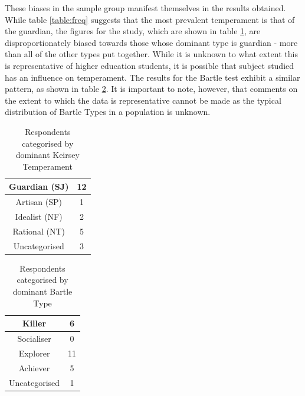 \documentclass[12pt,a4paper,twoside]{report}
\begin{document}
These biases in the sample group manifest themselves in the results obtained. While table \ref{table:freq} suggests that the most prevalent temperament is that of the guardian, the figures for the study, which are shown in table \ref{table:kfreq}, are disproportionately biased towards those whose dominant type is guardian - more than all of the other types put together. While it is unknown to what extent this is representative of higher education students, it is possible that subject studied has an influence on temperament. The results for the Bartle test exhibit a similar pattern, as shown in table \ref{table:bfreq}. It is important to note, however, that comments on the extent to which the data is representative cannot be made as the typical distribution of Bartle Types in a population is unknown.

\begin{table}
\begin{center}
\begin{tabular}{|c|c|}
	\hline Guardian (SJ) & 12 \\ 
	\hline Artisan (SP) & 1 \\ 
	\hline Idealist (NF) & 2 \\ 
	\hline Rational (NT) & 5 \\ 
	\hline Uncategorised & 3 \\ 
	\hline 
\end{tabular}
\end{center}
\caption{Respondents categorised by dominant Keirsey Temperament}
\label{table:kfreq}
\end{table}

\begin{table}
	\begin{center}
		\begin{tabular}{|c|c|}
			\hline Killer & 6 \\ 
			\hline Socialiser & 0 \\ 
			\hline Explorer & 11 \\ 
			\hline Achiever & 5 \\ 
			\hline Uncategorised & 1 \\ 
			\hline 
		\end{tabular}
	\end{center}
	\caption{Respondents categorised by dominant Bartle Type}
	\label{table:bfreq}
\end{table}
\end{document}
